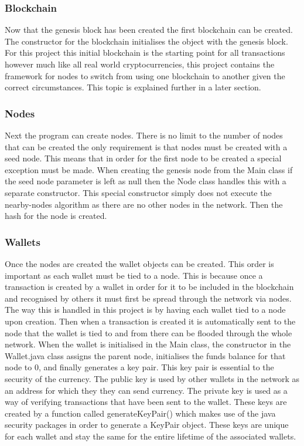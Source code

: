 \documentclass{l4proj}
\begin{document}
\subsubsection{Blockchain}
Now that the genesis block has been created the first blockchain can be created. The constructor for the blockchain
initialises the object with the genesis block. For this project this initial blockchain is the starting point for
all transactions however much like all real world cryptocurrencies, this project contains the framework for 
nodes to switch from using one blockchain to another given the correct circumstances. This topic is explained further
in a later section.

\subsubsection{Nodes}
Next the program can create nodes. There is no limit to the number of nodes that can be created the only 
requirement is that nodes must be created with a seed node. This means that in order for the first node to be created
a special exception must be made. When creating the genesis node from the Main class if the seed node parameter
is left as null then the Node class handles this with a separate constructor. This special constructor simply
does not execute the nearby-nodes algorithm as there are no other nodes in the network. Then the hash for the 
node is created. 

\subsubsection{Wallets}
Once the nodes are created the wallet objects can be created. This order is important as each wallet must be tied to
a node. This is because once a transaction is created by a wallet in order for it to be included in the blockchain
and recognised by others it must first be spread through the network via nodes. The way this is handled in this 
project is by having each wallet tied to a node upon creation. Then when a transaction is created it is automatically
sent to the node that the wallet is tied to and from there can be flooded through the whole network. When the wallet
is initialised in the Main class, the constructor in the Wallet.java class assigns the parent node, initialises the
funds balance for that node to 0, and finally generates a key pair. This key pair is essential to the security 
of the currency. The public key is used by other wallets in the network as an address for which they they can send
currency. The private key is used as a way of verifying transactions that have been sent to the wallet.
These keys are created by a function called generateKeyPair() which makes use of the java security packages in order
to generate a KeyPair object. These keys are unique for each wallet and stay the same for the entire lifetime
of the associated wallets. 
\end{document}
